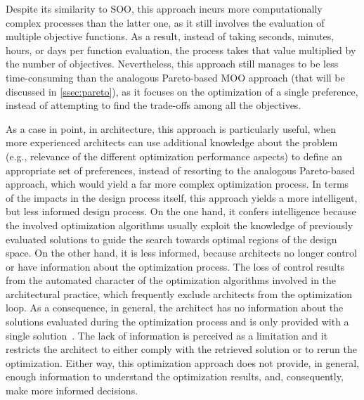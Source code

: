 	Despite its similarity to \ac{SOO}, this approach incurs more computationally complex processes than the latter one, as it still involves the evaluation of multiple objective functions. As a result, instead of taking seconds, minutes, hours, or days per function evaluation, the process takes that value multiplied by the number of objectives. Nevertheless, this approach still manages to be less time-consuming than the analogous Pareto-based \ac{MOO} approach (that will be discussed in \cref{ssec:pareto}), as it focuses on the optimization of a single preference, instead of attempting to find the trade-offs among all the objectives. 
	
	As a case in point, in architecture, this approach is particularly useful, when more experienced architects can use additional knowledge about the problem (e.g., relevance of the different optimization performance aspects) to define an appropriate set of preferences, instead of resorting to the analogous Pareto-based approach, which would yield a far more complex optimization process. In terms of the impacts in the design process itself, this approach yields a more intelligent, but less informed design process. On the one hand, it confers intelligence because the involved optimization algorithms usually exploit the knowledge of previously evaluated solutions to guide the search towards optimal regions of the design space. On the other hand, it is less informed, because architects no longer control or have information about the optimization process. The loss of control results from the automated character of the optimization algorithms involved in the architectural practice, which frequently exclude architects from the optimization loop. As a consequence, in general, the architect has no information about the solutions evaluated during the optimization process and is only provided with a single solution~\cite{Custodio2010}. The lack of information is perceived as a limitation \cite{Cichocka2017SURVEY} and it restricts the architect to either comply with the retrieved solution or to rerun the optimization. Either way, this optimization approach does not provide, in general, enough information to understand the optimization results, and, consequently, make more informed decisions. 
	
